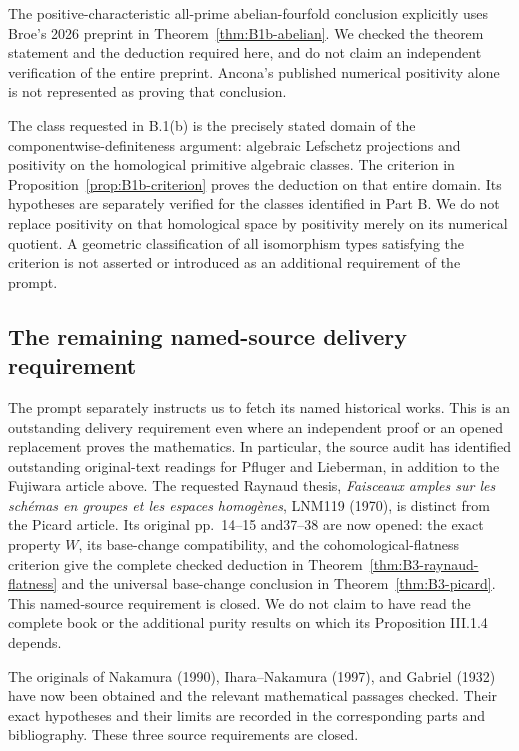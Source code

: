 The positive-characteristic all-prime abelian-fourfold conclusion
explicitly uses Broe's 2026 preprint in
Theorem~\ref{thm:B1b-abelian}. We checked the theorem statement and the
deduction required here, and do not claim an independent verification
of the entire preprint. Ancona's published numerical positivity alone
is not represented as proving that conclusion.

The class requested in B.1(b) is the precisely stated domain of the
componentwise-definiteness argument: algebraic Lefschetz projections
and positivity on the homological primitive algebraic classes.
The criterion in Proposition~\ref{prop:B1b-criterion} proves the
deduction on that entire domain. Its hypotheses are separately
verified for the classes identified in Part B. We do not replace
positivity on that homological space by positivity merely on its
numerical quotient. A geometric classification of all isomorphism
types satisfying the criterion is not asserted or introduced as an
additional requirement of the prompt.

\subsection{The remaining named-source delivery requirement}
The prompt separately instructs us to fetch its named historical works.
This is an outstanding delivery requirement even where an independent
proof or an opened replacement proves the mathematics. In particular,
the source audit has identified outstanding original-text readings for
Pfluger and Lieberman, in addition to the Fujiwara article above.
The requested Raynaud thesis, \emph{Faisceaux amples sur les sch\'emas
en groupes et les espaces homog\`enes}, LNM119 (1970), is distinct from
the Picard article. Its original pp.~14--15 and37--38 are now opened:
the exact property $W$, its base-change compatibility, and the
cohomological-flatness criterion give the complete checked deduction in
Theorem~\ref{thm:B3-raynaud-flatness} and the universal base-change
conclusion in Theorem~\ref{thm:B3-picard}. This named-source requirement
is closed. We do not claim to have read the complete book or the
additional purity results on which its Proposition III.1.4 depends.

The originals of Nakamura (1990), Ihara--Nakamura (1997), and
Gabriel (1932) have now been obtained and the relevant mathematical
passages checked. Their exact hypotheses and their limits are recorded
in the corresponding parts and bibliography. These three source
requirements are closed.

